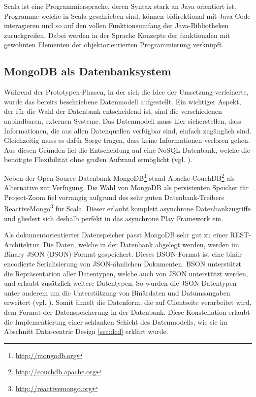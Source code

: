 Scala ist eine Programmiersprache, deren Syntax stark an Java orientiert ist. Programme welche in Scala geschrieben sind, können bidirektional mit Java-Code interagieren und so auf den vollen Funktionsumfang der Java-Bibliotheken zurückgreifen. Dabei werden in der Sprache Konzepte der funktionalen mit gewohnten Elementen der objektorientierten Programmierung verknüpft.

\subsection{MongoDB als Datenbanksystem}
Während der Prototypen-Phasen, in der sich die Idee der Umsetzung verfeinerte, wurde das bereits beschriebene Datenmodell aufgestellt. Ein wichtiger Aspekt, der für die Wahl der Datenbank entscheidend ist, sind die verschiedenen anbindbaren, externen Systeme. Das Datenmodell muss hier sicherstellen, dass Informationen, die aus allen Datenquellen verfügbar sind, einfach zugänglich sind. Gleichzeitig muss es dafür Sorge tragen, dass keine Informationen verloren gehen. Aus diesen Gründen fiel die Entscheidung auf eine NoSQL-Datenbank, welche die benötigte Flexibilität ohne großen Aufwand ermöglicht (vgl. \cite{mysgl-to-nosql}).

Neben der Open-Source Datenbank MongoDB\footnote{\url{http://mongodb.org}} stand Apache CouchDB\footnote{\url{http://couchdb.apache.org}} als Alternative zur Verfügung. Die Wahl von MongoDB als persistenten Speicher für Project-Zoom fiel vorrangig aufgrund des sehr guten Datenbank-Treibers ReactiveMongo\footnote{\url{http://reactivemongo.org}} für Scala. Dieser erlaubt komplett asynchrone Datenbankzugriffe und gliedert sich deshalb perfekt in das asynchrone Play Framework ein.

Als dokumentorientierter Datenspeicher passt MongoDB sehr gut zu einer REST-Architektur. Die Daten, welche in der Datenbank abgelegt werden, werden im Binary JSON (BSON)-Format gespeichert. Dieses BSON-Format ist eine binär encodierte Serialisierung von JSON-ähnlichen Dokumenten. BSON unterstützt die Repräsentation aller Datentypen, welche auch von JSON unterstützt werden, und erlaubt zusätzlich weitere Datentypen. So wurden die JSON-Datentypen unter anderem um die Unterstützung von Binärdaten und Datumsangaben erweitert (vgl. \cite{bson}). Somit ähnelt die Datenform, die auf Clientseite verarbeitet wird, dem Format der Datenspeicherung in der Datenbank. Diese Konstellation erlaubt die Implementierung einer schlanken Schicht des Datenmodells, wie sie im Abschnitt Data-centric Design \ref{sec:dcd} erklärt wurde.

